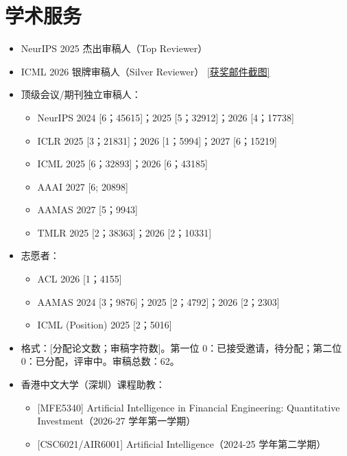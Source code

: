 \documentclass[a4paper,20pt]{article}
\begin{document}
\vspace{5pt}
\section{学术服务}
\vspace{3pt}

\begin{itemize}[leftmargin=*, itemsep=0pt, topsep=0pt, partopsep=0pt]
    \item NeurIPS 2025 杰出审稿人（Top Reviewer）
    \item ICML 2026 银牌审稿人（Silver Reviewer）
          \href{https://yuelin301.github.io/assets/img/about/icml-2026-silver-reviewer-award-email.png}{[获奖邮件截图]}
    \item 顶级会议/期刊独立审稿人：
    \begin{itemize}
        \item NeurIPS 2024 [6；45615]；2025 [5；32912]；2026 [4；17738]
        \item ICLR 2025 [3；21831]；2026 [1；5994]；2027 [6；15219]
        \item ICML 2025 [6；32893]；2026 [6；43185]
        \item AAAI 2027 [6; 20898]
        \item AAMAS 2027 [5；9943]
        \item TMLR 2025 [2；38363]；2026 [2；10331]
    \end{itemize}
    \item 志愿者：
    \begin{itemize}
        \item ACL 2026 [1；4155]
        \item AAMAS 2024 [3；9876]；2025 [2；4792]；2026 [2；2303]
        \item ICML (Position) 2025 [2；5016]
    \end{itemize}
    \item 格式：[分配论文数；审稿字符数]。第一位 0：已接受邀请，待分配；第二位 0：已分配，评审中。审稿总数：62。
    \item 香港中文大学（深圳）课程助教：
    \begin{itemize}
        \item {[MFE5340]} Artificial Intelligence in Financial Engineering: Quantitative Investment（2026-27 学年第一学期）
        \item {[CSC6021/AIR6001]} Artificial Intelligence（2024-25 学年第二学期）
    \end{itemize}
\end{itemize}
\end{document}
